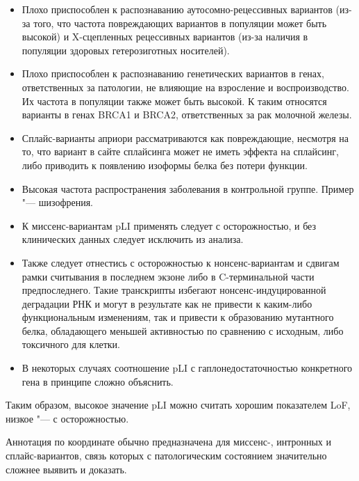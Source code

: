 \documentclass[a4paper,12pt]{article}
\begin{document}
\begin{enumerate}
\begin{itemize}
\item Плохо приспособлен к распознаванию аутосомно-рецессивных вариантов (из-за того, что частота повреждающих вариантов в популяции может быть высокой) и X-сцепленных рецессивных вариантов (из-за наличия в популяции здоровых гетерозиготных носителей).
\item Плохо приспособлен к распознаванию генетических вариантов в генах, ответственных за патологии, не влияющие на взросление и воспроизводство.
Их частота в популяции также может быть высокой.
К таким относятся варианты в генах BRCA1 и BRCA2, ответственных за рак молочной железы.
\item Сплайс-варианты априори рассматриваются как повреждающие, несмотря на то, что вариант в сайте сплайсинга может не иметь эффекта на сплайсинг, либо приводить к появлению изоформы белка без потери функции.
\item Высокая частота распространения заболевания в контрольной группе.
Пример "--- шизофрения.
\item К миссенс-вариантам pLI применять следует с осторожностью, и без клинических данных следует исключить из анализа.
\item Также следует отнестись с осторожностью к нонсенс-вариантам и сдвигам рамки считывания в последнем экзоне либо в C-терминальной части предпоследнего.
Такие транскрипты избегают нонсенс-индуцированной деградации РНК и могут в результате как не привести к каким-либо функциональным изменениям, так и привести к образованию мутантного белка, обладающего меньшей активностью по сравнению с исходным, либо токсичного для клетки.
\item В некоторых случаях соотношение pLI с гаплонедостаточностью конкретного гена в принципе сложно объяснить.
\end{itemize}

Таким образом, высокое значение pLI можно считать хорошим показателем LoF, низкое "--- с осторожностью.                                                                                                       \end{enumerate}

Аннотация по координате обычно предназначена для миссенс-, интронных и сплайс-вариантов, связь которых с патологическим состоянием значительно сложнее выявить и доказать.
\end{document}
